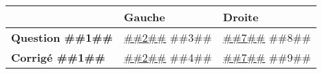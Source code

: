 \documentclass[a4paper,11pt]{article}
\begin{document}
\begin{longtable}{|p{3cm}|p{7.5cm}|p{7.5cm}|}
\hline 
 & Gauche & Droite \\
 

\hline 
\textbf{Question ##{{1}}##} & \underline{##{{2}}##} \newline ##{{3}}## & \underline{##{{7}}##} \newline ##{{8}}## \\



\hline 
\textbf{Corrigé ##{{1}}##} & \underline{##{{2}}##} \newline ##{{4}}## & \underline{##{{7}}##} \newline ##{{9}}## \\


 
\hline 
\end{longtable} 
\end{document}
